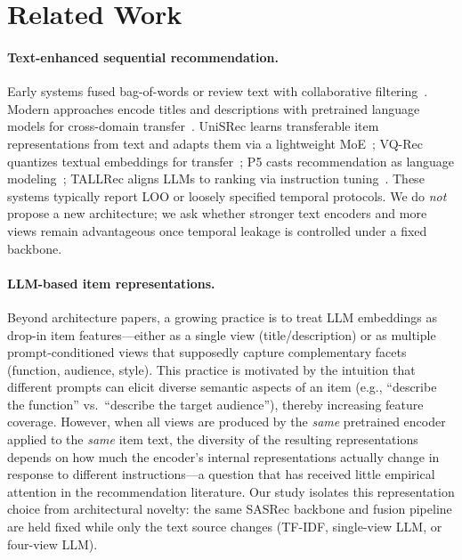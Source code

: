 \documentclass[sigconf,natbib=true,anonymous]{acmart}
\newcommand{\tfidf}{\textsc{TF-IDF}\xspace}
\newcommand{\llm}{\textsc{LLM}\xspace}
\begin{document}
\section{Related Work}
\label{sec:related}

\paragraph{Text-enhanced sequential recommendation.}
Early systems fused bag-of-words or review text with collaborative filtering~\cite{wang2015cdl,salton1988termweighting}.
Modern approaches encode titles and descriptions with pretrained language models for cross-domain transfer~\cite{hou2022unisrec,hou2023vqrec,geng2022p5,bao2023tallrec}.
UniSRec learns transferable item representations from text and adapts them via a lightweight MoE~\cite{hou2022unisrec}; VQ-Rec quantizes textual embeddings for transfer~\cite{hou2023vqrec}; P5 casts recommendation as language modeling~\cite{geng2022p5}; TALLRec aligns LLMs to ranking via instruction tuning~\cite{bao2023tallrec}.
These systems typically report LOO or loosely specified temporal protocols.
We do \emph{not} propose a new architecture; we ask whether stronger text encoders and more views remain advantageous once temporal leakage is controlled under a fixed backbone.

\paragraph{LLM-based item representations.}
Beyond architecture papers, a growing practice is to treat LLM embeddings as drop-in item features---either as a single view (title/description) or as multiple prompt-conditioned views that supposedly capture complementary facets (function, audience, style).
This practice is motivated by the intuition that different prompts can elicit diverse semantic aspects of an item (e.g., ``describe the function'' vs.\ ``describe the target audience''), thereby increasing feature coverage.
However, when all views are produced by the \emph{same} pretrained encoder applied to the \emph{same} item text, the diversity of the resulting representations depends on how much the encoder's internal representations actually change in response to different instructions---a question that has received little empirical attention in the recommendation literature.
Our study isolates this representation choice from architectural novelty: the same SASRec backbone and fusion pipeline are held fixed while only the text source changes (\tfidf, single-view \llm, or four-view \llm).
\end{document}
